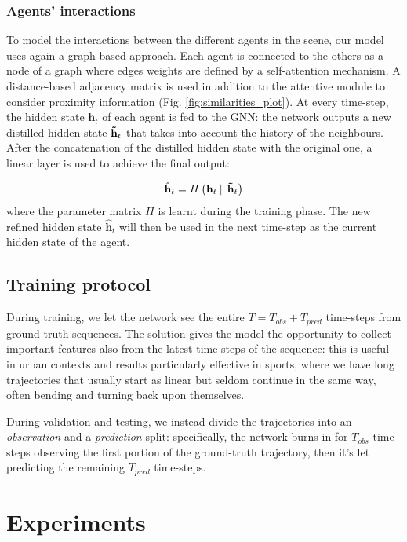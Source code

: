 \documentclass[10pt,a4paper,conference]{IEEEtran}
\begin{document}
\subsubsection{Agents' interactions}
To model the interactions between the different agents in the scene, our model uses again a graph-based approach. Each agent is connected to the others as a node of a graph where edges weights are defined by a self-attention mechanism. A distance-based adjacency matrix is used in addition to the attentive module to consider proximity information (Fig. \ref{fig:similarities_plot}). At every time-step, the hidden state $\mathbf{h}_t$ of each agent is fed to the GNN: the network outputs a new distilled hidden state $\mathbf{\Tilde{h}}_t$ that takes into account the history of the neighbours. After the concatenation of the distilled hidden state with the original one, a linear layer is used to achieve the final output:

\begin{equation}
    \label{eq:hg}
    \hat{\mathbf{h}}_t = H \left(\mathbf{h}_t \mathbin\Vert \mathbf{\Tilde{h}}_t\right)
\end{equation}
where the parameter matrix $H$ is learnt during the training phase. The new refined hidden state $\hat{\mathbf{h}}_t$ will then be used in the next time-step as the current hidden state of the agent.

\subsection{Training protocol}

During training, we let the network see the entire $T = T_{obs}+T_{pred}$ time-steps from ground-truth sequences. The solution gives the model the opportunity to collect important features also from the latest time-steps of the sequence: this is useful in urban contexts and results particularly effective in sports, where we have long trajectories that usually start as linear but seldom continue in the same way, often bending and turning back upon themselves.


During validation and testing, we instead divide the trajectories into an \textit{observation} and a \textit{prediction} split: specifically, the network burns in for $T_{obs}$ time-steps observing the first portion of the ground-truth trajectory, then it's let predicting the remaining $T_{pred}$ time-steps. \section{Experiments}
\end{document}
